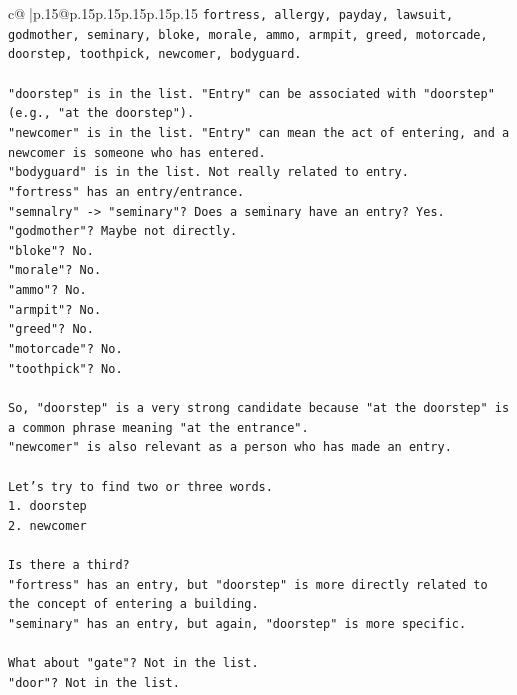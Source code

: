\documentclass{article}
\begin{document}
{\begin{supertabular}{c@{$\;$}|p{.15\linewidth}@{}p{.15\linewidth}p{.15\linewidth}p{.15\linewidth}p{.15\linewidth}p{.15\linewidth}}
{{{\texttt{fortress, allergy, payday, lawsuit, godmother, seminary, bloke, morale, ammo, armpit, greed, motorcade, doorstep, toothpick, newcomer, bodyguard.} \\
\\ 
\texttt{"doorstep" is in the list. "Entry" can be associated with "doorstep" (e.g., "at the doorstep").} \\
\texttt{"newcomer" is in the list. "Entry" can mean the act of entering, and a newcomer is someone who has entered.} \\
\texttt{"bodyguard" is in the list. Not really related to entry.} \\
\texttt{"fortress" has an entry/entrance.} \\
\texttt{"semnalry" {-}> "seminary"? Does a seminary have an entry? Yes.} \\
\texttt{"godmother"? Maybe not directly.} \\
\texttt{"bloke"? No.} \\
\texttt{"morale"? No.} \\
\texttt{"ammo"? No.} \\
\texttt{"armpit"? No.} \\
\texttt{"greed"? No.} \\
\texttt{"motorcade"? No.} \\
\texttt{"toothpick"? No.} \\
\\ 
\texttt{So, "doorstep" is a very strong candidate because "at the doorstep" is a common phrase meaning "at the entrance".} \\
\texttt{"newcomer" is also relevant as a person who has made an entry.} \\
\\ 
\texttt{Let's try to find two or three words.} \\
\texttt{1. doorstep} \\
\texttt{2. newcomer} \\
\\ 
\texttt{Is there a third?} \\
\texttt{"fortress" has an entry, but "doorstep" is more directly related to the concept of entering a building.} \\
\texttt{"seminary" has an entry, but again, "doorstep" is more specific.} \\
\\ 
\texttt{What about "gate"? Not in the list.} \\
\texttt{"door"? Not in the list.} \\
\\ 
}}}
\end{supertabular}}
\end{document}
